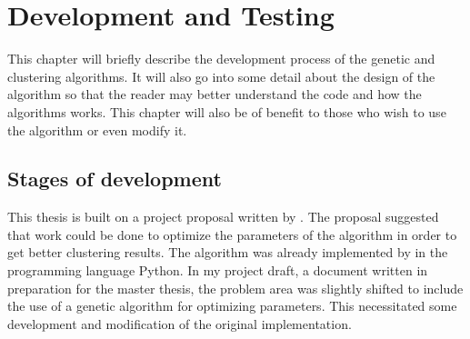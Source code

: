 
\chapter{Development and Testing} %

\label{Development} %



This chapter will briefly describe the development process of the genetic and clustering algorithms. It will also go into some detail about the design of the algorithm so that the reader may better understand the code and how the algorithms works. This chapter will also be of benefit to those who wish to use the algorithm or even modify it.


\section{Stages of development}

This thesis is built on a project proposal written by \supervisor. The proposal suggested that work could be done to optimize the parameters of the \STC algorithm in order to get better clustering results. The algorithm was already implemented by \supervisor in the programming language Python. In my project draft, a document written in preparation for the master thesis, the problem area was slightly shifted to include the use of a genetic algorithm for optimizing parameters. This necessitated some development and modification of the original implementation.

